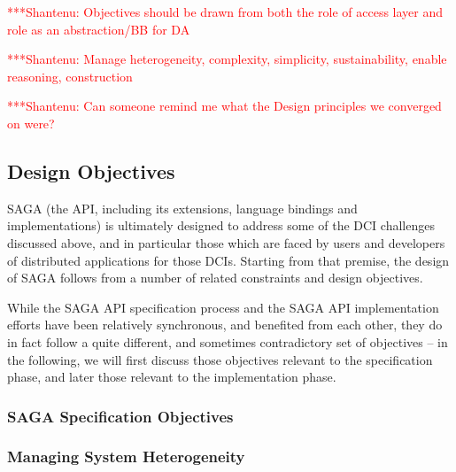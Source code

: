 \documentclass[a4paper,12pt]{article}
\newcommand{\jhanote}[1]{  {\textcolor{red}  { ***Shantenu: #1 }}}
\newcommand{\jhanote}[1]{}
\begin{document}

 \jhanote{Objectives should be drawn from both the role of access
   layer and role as an abstraction/BB for DA}

 \jhanote{Manage heterogeneity, complexity, simplicity,
   sustainability, enable reasoning, construction}

 \jhanote{Can someone remind me what the Design principles we
   converged on were?}

 \subsection{Design Objectives}


  SAGA (the API, including its extensions, language bindings and
  implementations) is ultimately designed to address some of the DCI
  challenges discussed above, and in particular those which are faced
  by users and developers of distributed applications for those DCIs.
  Starting from that premise, the design of SAGA follows from a number
  of related constraints and design objectives.

  While the SAGA API specification process and the SAGA API
  implementation efforts have been relatively synchronous, and
  benefited from each other, they do in fact follow a quite different,
  and sometimes contradictory set of objectives -- in the following,
  we will first discuss those objectives relevant to the specification
  phase, and later those relevant to the implementation phase.

  \subsubsection{SAGA Specification Objectives}
  \label{sec:designobjectives.spec}

   \subsubsection*{Managing System Heterogeneity}

\end{document}
